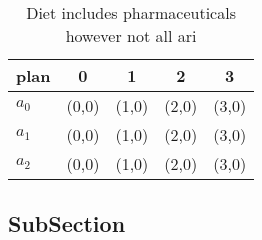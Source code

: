 \documentclass[a4paper]{article}
\begin{document}
\begin{table}
\begin{adjustbox}{width=0.6\columnwidth}
\begin{tabular}{|l|l|l|l|l|}
\hline
\textbf{plan} & \multicolumn{1}{c|}{\textbf{0}} & \multicolumn{1}{c|}{\textbf{1}} & \multicolumn{1}{c|}{\textbf{2}} & \multicolumn{1}{c|}{\textbf{3}} \\ \hline
\textbf{$a_0$}  & (0,0) & (1,0) & (2,0) & (3,0) \\ \hline
\textbf{$a_1$}  & (0,0) & (1,0) & (2,0) & (3,0) \\ \hline
\textbf{$a_2$}  & (0,0) & (1,0) & (2,0) & (3,0) \\ \hline
\end{tabular}
\end{adjustbox}
\caption{Diet includes pharmaceuticals however not all ari
}
\end{table}

\subsection{SubSection}
\end{document}
